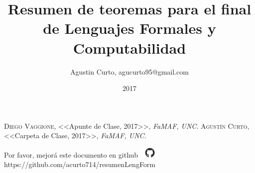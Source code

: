 \documentclass[12pt,a4paper]{report}
\author{Agustin Curto, agucurto95@gmail.com}
\title{Resumen de teoremas para el final \\ de Lenguajes Formales y Computabilidad}
\date{2017}
\begin{document}
\maketitle
\tableofcontents

\begin{thebibliography}{X}
 \textsc{Diego Vaggione},
<<Apunte de Clase, 2017>>,
\textit{FaMAF, UNC}.
 \textsc{Agustín Curto},
<<Carpeta de Clase, 2017>>,
\textit{FaMAF, UNC}.
\end{thebibliography}

\vspace{\fill}
\begin{center}
Por favor, mejorá este documento en github
\includegraphics[width=1cm]{graphics/github.png} \\
https://github.com/acurto714/resumenLengForm
\end{center}
\end{document}
